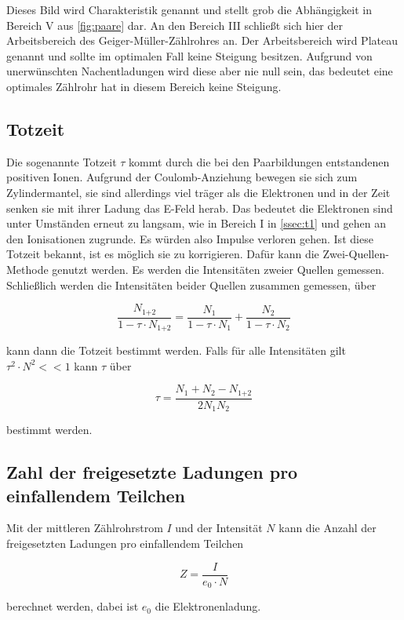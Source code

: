 Dieses Bild wird Charakteristik genannt und stellt grob die Abhängigkeit in Bereich V aus \autoref{fig:paare} dar.
An den Bereich III schließt sich hier der Arbeitsbereich des Geiger-Müller-Zählrohres an.
Der Arbeitsbereich wird Plateau genannt und sollte im optimalen Fall keine Steigung besitzen.
Aufgrund von unerwünschten Nachentladungen wird diese aber nie null sein, das bedeutet eine optimales Zählrohr hat in diesem Bereich keine Steigung.

\subsection{Totzeit}
\label{ssec:t3}

Die sogenannte Totzeit $\tau$ kommt durch die bei den Paarbildungen entstandenen positiven Ionen.
Aufgrund der Coulomb-Anziehung bewegen sie sich zum Zylindermantel, sie sind allerdings viel träger als die Elektronen und in der Zeit senken sie mit ihrer Ladung das E-Feld herab.
Das bedeutet die Elektronen sind unter Umständen erneut zu langsam, wie in Bereich I in \autoref{ssec:t1} und gehen an den Ionisationen zugrunde. 
Es würden also Impulse verloren gehen.
Ist diese Totzeit bekannt, ist es möglich sie zu korrigieren.
Dafür kann die Zwei-Quellen-Methode genutzt werden.
Es werden die Intensitäten zweier Quellen gemessen.
Schließlich werden die Intensitäten beider Quellen zusammen gemessen, über 

\begin{equation}
    \frac{N_\text{1+2}}{1 - \tau \cdot N_\text{1+2}} = \frac{N_\text{1}}{1 - \tau \cdot N_\text{1}} + \frac{N_\text{2}}{1 - \tau \cdot N_\text{2}}
    \label{eq:tot1}
\end{equation}

kann dann die Totzeit bestimmt werden.
Falls für alle Intensitäten gilt $\tau ^2 \cdot N^2 << 1$ kann $\tau$ über 

\begin{equation}
    \tau = \frac{N_\text{1} + N_\text{2} - N_\text{1+2}}{2 N_\text{1} N_\text{2}}
    \label{eq:tot2}
\end{equation}

bestimmt werden.

\subsection{Zahl der freigesetzte Ladungen pro einfallendem Teilchen}
\label{ssec:t4}

Mit der mittleren Zählrohrstrom $I$ und der Intensität $N$ kann die Anzahl der freigesetzten Ladungen pro einfallendem Teilchen 

\begin{equation}
    Z = \frac{I}{e_0 \cdot N} 
    \label{eq:z}
\end{equation}

berechnet werden, dabei ist $e_0$ die Elektronenladung.